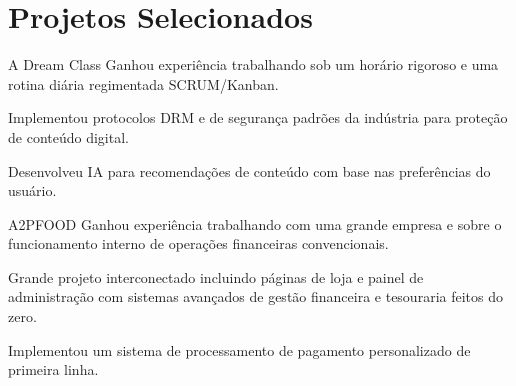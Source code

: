 \section{Projetos Selecionados}

\begin{experience}{A Dream Class}{
}
Ganhou experiência trabalhando sob um horário rigoroso e uma rotina diária regimentada SCRUM/Kanban.

\begin{contribs}
	\item{Implementou protocolos DRM e de segurança padrões da indústria para proteção de conteúdo digital.}
	\item{Desenvolveu IA para recomendações de conteúdo com base nas preferências do usuário.}
\end{contribs}
\end{experience}

\begin{experience}{A2PFOOD}{
}
Ganhou experiência trabalhando com uma grande empresa e sobre o funcionamento interno de operações financeiras convencionais.

\begin{contribs}
	\item{Grande projeto interconectado incluindo páginas de loja e painel de administração com sistemas avançados de gestão financeira e tesouraria feitos do zero.}
	\item{Implementou um sistema de processamento de pagamento personalizado de primeira linha.}
\end{contribs}
\end{experience}
